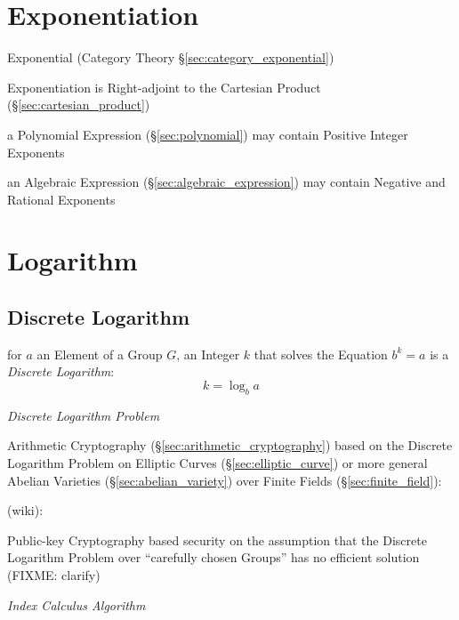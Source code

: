 \section{Exponentiation}\label{sec:exponentiation}

\fist Exponential (Category Theory \S\ref{sec:category_exponential})

Exponentiation is Right-adjoint to the Cartesian Product
(\S\ref{sec:cartesian_product})

a Polynomial Expression (\S\ref{sec:polynomial}) may contain
Positive Integer Exponents

an Algebraic Expression (\S\ref{sec:algebraic_expression}) may contain Negative
and Rational Exponents



\section{Logarithm}\label{sec:logarithm}

\subsection{Discrete Logarithm}\label{sec:discrete_logarithm}

for $a$ an Element of a Group $G$, an Integer $k$ that solves the Equation $b^k
= a$ is a \emph{Discrete Logarithm}:
\[
  k = \log_b a
\]

\emph{Discrete Logarithm Problem}

\fist Arithmetic Cryptography (\S\ref{sec:arithmetic_cryptography}) based on
the Discrete Logarithm Problem on Elliptic Curves (\S\ref{sec:elliptic_curve})
or more general Abelian Varieties (\S\ref{sec:abelian_variety}) over Finite
Fields (\S\ref{sec:finite_field}):

(wiki):

Public-key Cryptography based security on the assumption that the Discrete
Logarithm Problem over ``carefully chosen Groups'' has no efficient solution
(FIXME: clarify)


\emph{Index Calculus Algorithm}




